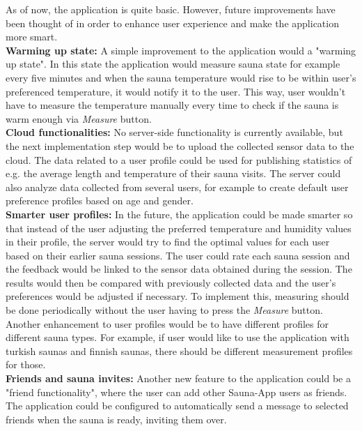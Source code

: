 \documentclass[11pt]{article}
\begin{document}
As of now, the application is quite basic. However, future improvements have been thought of in order to enhance user experience and make the application more smart. \\

\noindent\textbf{Warming up state:} A simple improvement to the application would a "warming up state". In this state the application would measure sauna state for example every five minutes and when the sauna temperature would rise to be within user's preferenced temperature, it would notify it to the user. This way, user wouldn't have to measure the temperature manually every time to check if the sauna is warm enough via \textit{Measure} button. \\

\noindent\textbf{Cloud functionalities:} No server-side functionality is currently available, but the next implementation step would be to upload the collected sensor data to the cloud. The data related to a user profile could be used for publishing statistics of e.g. the average length and temperature of their sauna visits. The server could also analyze data collected from several users, for example to create default user preference profiles based on age and gender. \\

\noindent\textbf{Smarter user profiles:} In the future, the application could be made smarter so that instead of the user adjusting the preferred temperature and humidity values in their profile, the server would try to find the optimal values for each user based on their earlier sauna sessions. The user could rate each sauna session and the feedback would be linked to the sensor data obtained during the session. The results would then be compared with previously collected data and the user's preferences would be adjusted if necessary. To implement this, measuring should be done periodically without the user having to press the \textit{Measure} button. Another enhancement to user profiles would be to have different profiles for different sauna types. For example, if user would like to use the application with turkish saunas and finnish saunas, there should be different measurement profiles for those. \\

\noindent\textbf{Friends and sauna invites:} Another new feature to the application could be a "friend functionality", where the user can add other Sauna-App users as friends. The application could be configured to automatically send a message to selected friends when the sauna is ready, inviting them over. \\
\end{document}
